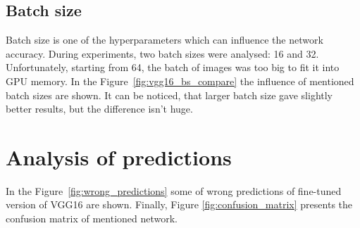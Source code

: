 \documentclass{article}
\begin{document}
    \subsection{Batch size}\label{subsec:batchSize}
    Batch size is one of the hyperparameters which can influence the network accuracy.
    During experiments, two batch sizes were analysed: 16 and 32.
    Unfortunately, starting from 64, the batch of images was too big to fit it into GPU memory.
    In the Figure~\ref{fig:vgg16_bs_compare} the influence of mentioned batch sizes are shown.
    It can be noticed, that larger batch size gave slightly better results, but the difference isn't huge.

    \newpage
    \section{Analysis of predictions}\label{sec:analysisOfPredictions}
    In the Figure~\ref{fig:wrong_predictions} some of wrong predictions of fine-tuned version of VGG16 are shown. Finally, Figure \ref{fig:confusion_matrix} presents the confusion matrix of mentioned network.
\end{document}
